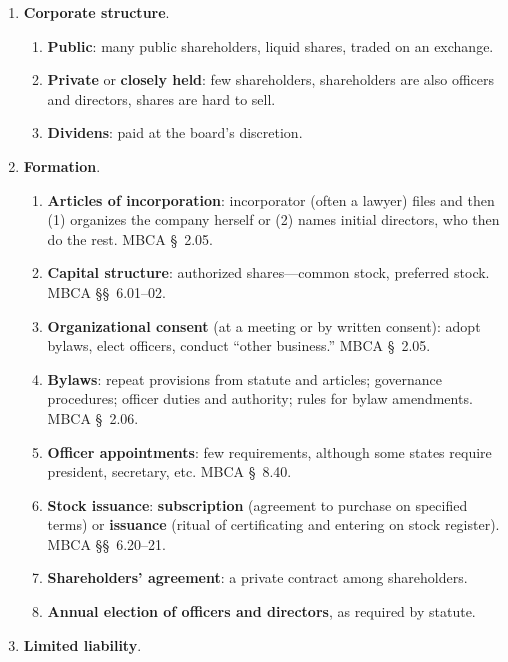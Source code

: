 \begin{enumerate}
    \item \textbf{Corporate structure}.
    \begin{enumerate}
        \item \textbf{Public}: many public shareholders, liquid shares, traded 
        on an exchange.
        \item \textbf{Private} or \textbf{closely held}: few shareholders, 
        shareholders are also officers and directors, shares are hard to sell.
        \item \textbf{Dividens}: paid at the board's discretion.
    \end{enumerate}
    \item \textbf{Formation}.
    \begin{enumerate}
        \item \textbf{Articles of incorporation}: incorporator (often a 
        lawyer) files and then (1) organizes the company herself or (2) names 
        initial directors, who then do the rest. MBCA \S\ 2.05.
        \item \textbf{Capital structure}: authorized shares---common stock, 
        preferred stock. MBCA \S\S\ 6.01--02.
        \item \textbf{Organizational consent} (at a meeting or by written 
        consent): adopt bylaws, elect officers, conduct ``other business.'' 
        MBCA \S\ 2.05.
        \item \textbf{Bylaws}: repeat provisions from statute and articles; 
        governance procedures; officer duties and authority; rules for bylaw 
        amendments. MBCA \S\ 2.06.
        \item \textbf{Officer appointments}: few requirements, although some 
        states require president, secretary, etc. MBCA \S\ 8.40.
        \item \textbf{Stock issuance}: \textbf{subscription} (agreement to 
        purchase on specified terms) or \textbf{issuance} (ritual of 
        certificating and entering on stock register). MBCA \S\S\ 6.20--21.
        \item \textbf{Shareholders' agreement}: a private contract among 
        shareholders.
        \item \textbf{Annual election of officers and directors}, as required 
        by statute.
    \end{enumerate}
    \item \textbf{Limited liability}.
    \begin{enumerate}

\end{enumerate}
\end{enumerate}
